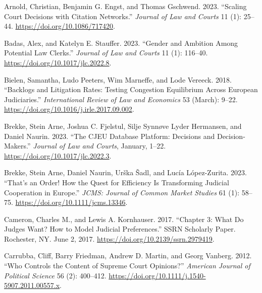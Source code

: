 \documentclass[
  11pt,
]{article}
\newlength{\cslhangindent}
\newenvironment{CSLReferences}[2] %
 {%
  \setlength{\parindent}{0pt}
  \ifodd #1 \everypar{\setlength{\hangindent}{\cslhangindent}}\ignorespaces\fi
  \ifnum #2 > 0
  \setlength{\parskip}{#2\baselineskip}
  \fi
 }%
 {}
\begin{document}
\hypertarget{refs}{}
\begin{CSLReferences}{1}{0}
\leavevmode{}%
Arnold, Christian, Benjamin G. Engst, and Thomas Gschwend. 2023.
{``Scaling {Court Decisions} with {Citation Networks}.''} \emph{Journal
of Law and Courts} 11 (1): 25--44. \url{https://doi.org/10.1086/717420}.

\leavevmode{}%
Badas, Alex, and Katelyn E. Stauffer. 2023. {``Gender and {Ambition
Among Potential Law Clerks}.''} \emph{Journal of Law and Courts} 11 (1):
116--40. \url{https://doi.org/10.1017/jlc.2022.8}.

\leavevmode{}%
Bielen, Samantha, Ludo Peeters, Wim Marneffe, and Lode Vereeck. 2018.
{``Backlogs and Litigation Rates: {Testing} Congestion Equilibrium
Across {European} Judiciaries.''} \emph{International Review of Law and
Economics} 53 (March): 9--22.
\url{https://doi.org/10.1016/j.irle.2017.09.002}.

\leavevmode{}%
Brekke, Stein Arne, Joshua C. Fjelstul, Silje Synnøve Lyder Hermansen,
and Daniel Naurin. 2023. {``The {CJEU Database Platform}: {Decisions}
and {Decision-Makers}.''} \emph{Journal of Law and Courts}, January,
1--22. \url{https://doi.org/10.1017/jlc.2022.3}.

\leavevmode{}%
Brekke, Stein Arne, Daniel Naurin, Urška Šadl, and Lucía López-Zurita.
2023. {``That's an {Order}! {How} the {Quest} for {Efficiency Is
Transforming Judicial Cooperation} in {Europe}.''} \emph{JCMS: Journal
of Common Market Studies} 61 (1): 58--75.
\url{https://doi.org/10.1111/jcms.13346}.

\leavevmode{}%
Cameron, Charles M., and Lewis A. Kornhauser. 2017. {``Chapter 3: {What
Do Judges Want}? {How} to {Model Judicial Preferences}.''} SSRN
Scholarly Paper. {Rochester, NY}. June 2, 2017.
\url{https://doi.org/10.2139/ssrn.2979419}.

\leavevmode{}%
Carrubba, Cliff, Barry Friedman, Andrew D. Martin, and Georg Vanberg.
2012. {``Who {Controls} the {Content} of {Supreme Court Opinions}?''}
\emph{American Journal of Political Science} 56 (2): 400--412.
\url{https://doi.org/10.1111/j.1540-5907.2011.00557.x}.


\end{CSLReferences}
\end{document}
